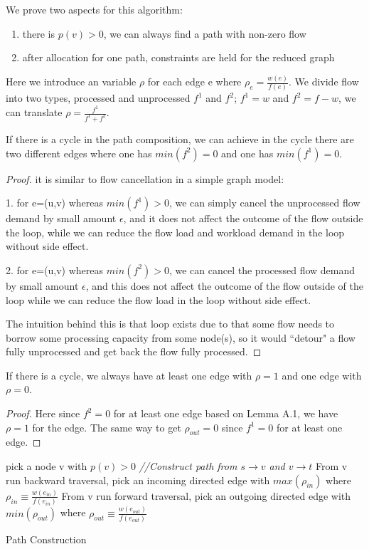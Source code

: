 We prove two aspects for this algorithm: 
\begin{enumerate}
  \item {there is $p(v) >0$, we can always find a path with non-zero flow}
   \item {after allocation for one path, constraints are held for the reduced graph} 
\newline
\end{enumerate}
Here we introduce an variable $\rho$ for each edge e where $\rho_{e} = \frac{ w(e)}{f(e)}$. We divide flow into two types, processed and unprocessed $f^1$ and $f^2$; $f^1=w$ and $f^2=f-w$, we can translate $\rho = \frac{ f^1} {f^1+f^2 }$.

\begin{lemma} If there is a cycle in the path composition, we can achieve in the cycle there are two different edges where one has $min(f^2) = 0$ and one has $min(f^1)=0$. 
\end{lemma} 
\begin{proof} it is similar to flow cancellation in a simple graph model: 

1. for e=(u,v) whereas $min(f^1) >0$, we can simply cancel the unprocessed flow demand by small amount $\epsilon$, and it does not affect the outcome of the flow outside the loop, while we can reduce the flow load and workload demand in the loop without side effect. 

2. for e=(u,v) whereas $min(f^2)>0$, we can cancel the processed flow demand by small amount $\epsilon$, and this does not affect the outcome of the flow outside of the loop while we can reduce the flow load in the loop without side effect. 

The intuition behind this is that loop exists due to that some flow needs to borrow some processing capacity from some node(s), so it would ``detour" a flow fully unprocessed and get back the flow fully processed. 
\end{proof}

\begin{lemma}
If there is a cycle, we always have at least one edge with $\rho =1$ and one edge with $\rho =0$.
\end{lemma}
\begin{proof}
 Here since $f^2=0$ for at least one edge based on Lemma A.1, we have $\rho=1$ for the edge. The same way to get $\rho_{out}=0$ since $f^1=0$ for at least one edge. 
\end{proof}
\begin{algorithm}  \label{path construction}
\SetAlgoLined
\BlankLine
pick a node v with $p(v)>0$\;
\emph{//Construct path from $s\rightarrow v$ and $v\rightarrow t$}\;
From v run backward traversal, pick an incoming directed edge with $ max( \rho_{in} )  $ where $\rho_{in} \equiv \frac{ w(e_{in})}{f(e_{in})}$\;
From v run forward traversal, pick an outgoing directed edge with $ min(\rho_{out} ) $ where $\rho_{out} \equiv \frac{ w(e_{out})}{f(e_{out})} $\;
\caption{Path Construction}
\end{algorithm}

